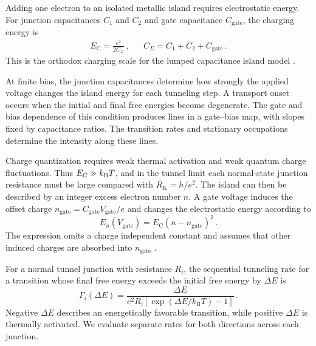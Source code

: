             Adding one electron to an isolated metallic island requires electrostatic energy. For junction capacitances $C_1$ and $C_2$ and gate capacitance $C_\mathrm{gate}$, the charging energy is
            \begin{align}
                E_\mathrm{C} = \frac{e^2}{2C_\Sigma}\,, &&
                 C_\Sigma = C_1 + C_2 + C_\mathrm{gate}\,.
                \label{eq:stochastic:charging-energy}
            \end{align}
            This is the orthodox charging scale for the lumped capacitance island model \cite{ingold_charge_1992,grabert_single_2013}.

            At finite bias, the junction capacitances determine how strongly the applied voltage changes the island energy for each tunneling step. A transport onset occurs when the initial and final free energies become degenerate. The gate and bias dependence of this condition produces lines in a gate--bias map, with slopes fixed by capacitance ratios. The transition rates and stationary occupations determine the intensity along these lines.

            Charge quantization requires weak thermal activation and weak quantum charge fluctuations. Thus $E_\mathrm{C}\sgg k_\mathrm{B}T$, and in the tunnel limit each normal-state junction resistance must be large compared with $R_\mathrm{K}=h/e^2$. The island can then be described by an integer excess electron number $n$. A gate voltage induces the offset charge $n_\mathrm{gate}=C_\mathrm{gate}V_\mathrm{gate}/e$ and changes the electrostatic energy according to
            \begin{equation}
                E_n(V_\mathrm{gate}) = E_\mathrm{C}\left(n-n_\mathrm{gate}\right)^2\,.
                \label{eq:stochastic:set-electrostatic-energy}
            \end{equation}
            The expression omits a charge independent constant and assumes that other induced charges are absorbed into $n_\mathrm{gate}$ \cite{ingold_charge_1992,grabert_single_2013}.

            For a normal tunnel junction with resistance $R_i$, the sequential tunneling rate for a transition whose final free energy exceeds the initial free energy by $\Delta E$ is
            \begin{equation}
                \Gamma_i(\Delta E)
                =
                \frac{\Delta E}{e^2R_i\left[\exp\left(\Delta E/k_\mathrm{B}T\right)-1\right]}\,.
                \label{eq:stochastic:set-normal-rate}
            \end{equation}
            Negative $\Delta E$ describes an energetically favorable transition, while positive $\Delta E$ is thermally activated. We evaluate separate rates for both directions across each junction.

